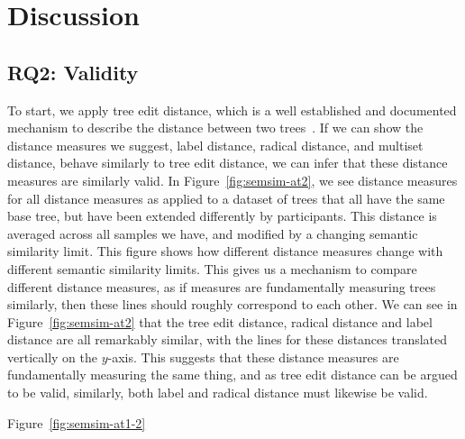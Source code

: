 \section{Discussion}
\label{sec:dicsussion}


\subsection{RQ2: Validity}

To start, we apply tree edit distance, which is a well established and documented mechanism to describe the distance between two trees~\cite{Zhang_Shasha_1989,zhang_editing_1992,akutsu_tree_2021,pawlik_rted_2011,mcvicar_sumoted_2016}. If we can show the distance measures we suggest, label distance, radical distance, and multiset distance, behave similarly to tree edit distance, we can infer that these distance measures are similarly valid. In Figure~\ref{fig:semsim-at2}, we see distance measures for all distance measures as applied to a dataset of trees that all have the same base tree, but have been extended differently by participants. This distance is averaged across all samples we have, and modified by a changing semantic similarity limit. This figure shows how different distance measures change with different semantic similarity limits. This gives us a mechanism to compare different distance measures, as if measures are fundamentally measuring trees similarly, then these lines should roughly correspond to each other. We can see in Figure~\ref{fig:semsim-at2} that the tree edit distance, radical distance and label distance are all remarkably similar, with the lines for these distances translated vertically on the $y$-axis. This suggests that these distance measures are fundamentally measuring the same thing, and as tree edit distance can be argued to be valid, similarly, both label and radical distance must likewise be valid.

Figure~\ref{fig:semsim-at1-2}

